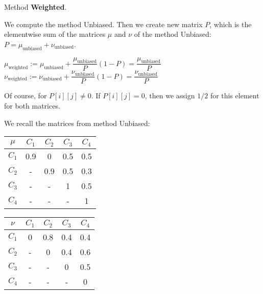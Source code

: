 \documentclass{beamer}
\begin{document}
\begin{frame}
Method \textbf{Weighted}.

\bigskip
We compute the method Unbiased.
Then we create new matrix $P$, which is the elementwise sum of the matrices $\mu$ and $\nu$ of the method Unbiased:
$P = \mu_{\text{unbiased}} + \nu_{\text{unbiased}}$.

\bigskip
$\mu_{\text{weighted}} := \mu_{\text{unbiased}} + \dfrac{\mu_{\text{unbiased}}}{P}(1 - P) = \dfrac{\mu_{\text{unbiased}}}{P}$
$\nu_{\text{weighted}} := \nu_{\text{unbiased}} + \dfrac{\nu_{\text{unbiased}}}{P}(1 - P) = \dfrac{\nu_{\text{unbiased}}}{P}$

\bigskip
Of course, for $P[i][j] \neq 0$. If $P[i][j] = 0$, then we assign $1/2$ for this element for both matrices.

\bigskip
We recall the matrices from method Unbiased:
\begin{center}
\begin{minipage}[b]{0.4\linewidth}
\begin{tabular}{c|cccc}
$\mu$ & $C_1$ & $C_2$ & $C_3$ & $C_4$ \\
\hline $C_1$ & 0.9 & 0 & 0.5 & 0.5 \\
$C_2$ & - & 0.9 & 0.5 & 0.3 \\
$C_3$ & - & - & 1 & 0.5 \\
$C_4$ & - & - & - & 1
\end{tabular}
\end{minipage}
\begin{minipage}[b]{0.4\linewidth}
\begin{tabular}{c|cccc}
$\nu$ & $C_1$ & $C_2$ & $C_3$ & $C_4$ \\
\hline $C_1$ & 0 & 0.8 & 0.4 & 0.4 \\
$C_2$ & - & 0 & 0.4 & 0.6 \\
$C_3$ & - & - & 0 & 0.5 \\
$C_4$ & - & - & - & 0
\end{tabular}
\end{minipage}
\end{center}
\end{frame}
\end{document}
